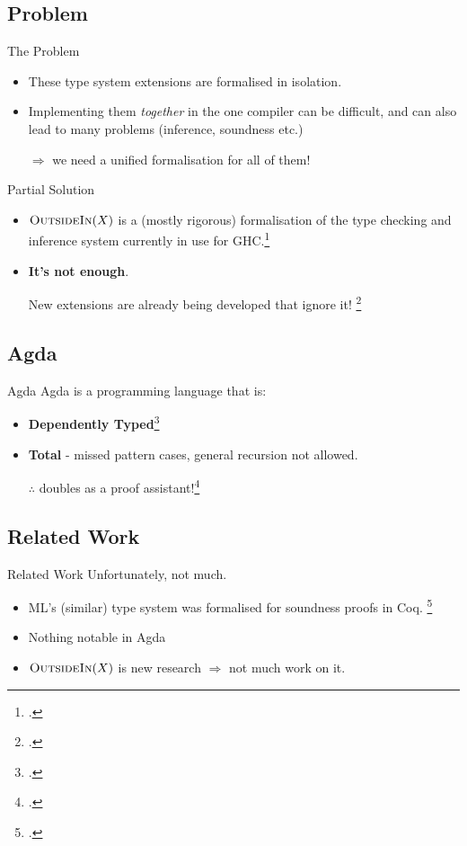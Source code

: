 \documentclass{beamer}
\begin{document}
\subsection{Problem}
\begin{frame}{The Problem}
	\begin{itemize}
	\item These type system extensions are formalised in isolation.
	\pause
	\item Implementing them \emph{together} in the one compiler can be difficult, and can also lead to many problems (inference, soundness etc.)
	\pause
	
	\medskip
	
	$\Longrightarrow$ we need a unified formalisation for all of them!
	\end{itemize}
\end{frame}	
\begin{frame}{Partial Solution}
	\begin{itemize}
	\item $\textsc{OutsideIn}(X)$ is a (mostly rigorous) formalisation of the type checking and inference system currently in use for GHC.\footcite{Vytiniotis:2011:OMT:2139531.2139533}
	\pause
	\item \textbf{It's not enough}. 
	
     New extensions are already being developed that ignore it! \footcite{Yorgey:2012:GHP:2103786.2103795}			
	\end{itemize}
\end{frame}	

\subsection{Agda}
\begin{frame}{Agda}
	Agda is a programming language that is:
	\begin{itemize}
		\item \textbf{Dependently Typed}\footcite{MartinLof:1984tr}
		\pause
		\item \textbf{Total} - missed pattern cases, general recursion not allowed.
		\pause		
				
		$\therefore$ doubles as a proof assistant!\footcite{Howard:1980vs}
	\end{itemize}
\end{frame}
\subsection{Related Work}
\begin{frame}{Related Work}
	Unfortunately, not much.
	\begin{itemize}
		\item ML's (similar) type system was formalised for soundness proofs in Coq. \footcite{Dubois00provingml}
		\pause
		\item Nothing notable in Agda
		\item $\textsc{OutsideIn}(X)$ is new research $\Rightarrow$ not much work on it.
	\end{itemize}
\end{frame}
\end{document}
